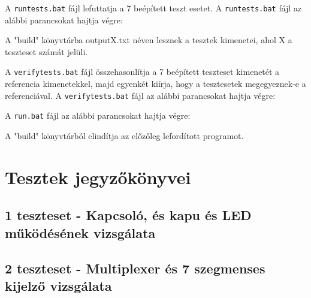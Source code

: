 A \texttt{runtests.bat} fájl lefuttatja a 7 beépített teszt esetet.
A \texttt{runtests.bat} fájl az alábbi parancsokat hajtja végre:

A "build" könyvtárba outputX.txt néven lesznek a tesztek kimenetei, ahol X a teszteset számát jelüli.

A \texttt{verifytests.bat} fájl összehasonlítja a 7 beépített teszteset kimenetét a referencia kimenetekkel, majd egyenkét kiírja, hogy a tesztesetek megegyeznek-e a referenciával.
A \texttt{verifytests.bat} fájl az alábbi parancsokat hajtja végre:



A \texttt{run.bat} fájl az alábbi parancsokat hajtja végre:

A "build" könyvtárból elindítja az előzőleg lefordított programot.










\section{Tesztek jegyzőkönyvei}

\subsection{1 teszteset - Kapcsoló, és kapu és LED működésének vizsgálata}

\subsection{2 teszteset - Multiplexer és 7 szegmenses kijelző vizsgálata}


